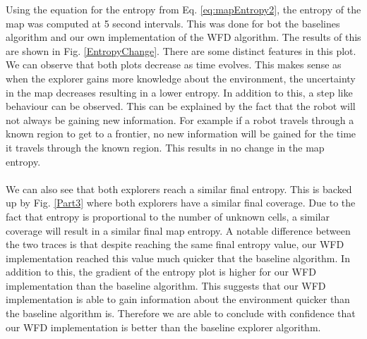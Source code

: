 \documentclass[a4paper,12pt]{article}
\begin{document}
			Using the equation for the entropy from Eq. \ref{eq:mapEntropy2}, the entropy of the map was computed at 5 second intervals. This was done for bot the baselines algorithm and our own implementation of the WFD algorithm. The results of this are shown in Fig. \ref{EntropyChange}. There are some distinct features in this plot. We can observe that both plots decrease as time evolves. This makes sense as when the explorer gains more knowledge about the environment, the uncertainty in the map decreases resulting in a lower entropy. In addition to this, a step like behaviour can be observed. This can be explained by the fact that the robot will not always be gaining new information. For example if a robot travels through a known region to get to a frontier, no new information will be gained for the time it travels through the known region. This results in no change in the map entropy. 
			\\
			\\
			We can also see that both explorers reach a similar final entropy. This is backed up by Fig. \ref{Part3} where both explorers have a similar final coverage. Due to the fact that entropy is proportional to the number of unknown cells, a similar coverage will result in a similar final map entropy. A notable difference between the two traces is that despite reaching the same final entropy value, our WFD implementation reached this value much quicker that the baseline algorithm. In addition to this, the gradient of the entropy plot is higher for our WFD implementation than the baseline algorithm. This suggests that our WFD implementation is able to gain information about the environment quicker than the baseline algorithm is. Therefore we are able to conclude with confidence that our WFD implementation is better than the baseline explorer algorithm. 
	
	\newpage
	
	
	\newpage
	\appendix
	\appendixpage
	\addappheadtotoc
	
\end{document}
